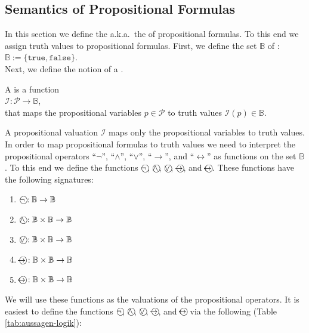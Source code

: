 \subsection{Semantics of Propositional Formulas}
In this section we define the  a.k.a.~the  of propositional
formulas.  To this end we assign truth values to propositional formulas.  First, we define the set 
$\mathbb{B}$  of :  \\[0.2cm] 
\hspace*{1.3cm} $\mathbb{B} := \{ \texttt{true}, \texttt{false} \}$. \\[0.2cm]
Next, we define the notion of a .

\begin{Definition}
  A 
   is a function \\[0.2cm]
  \hspace*{1.3cm} $\mathcal{I}:\mathcal{P} \rightarrow \mathbb{B}$, \\[0.2cm]
  that maps the propositional variables  $p\in \mathcal{P}$ to truth values $\mathcal{I}(p) \in \mathbb{B}$.
  \eox
\end{Definition}

A propositional valuation $\mathcal{I}$ maps only the propositional variables to truth values.
In order to map propositional formulas to truth values we need to interpret the propositional operators 
``$\neg$'', ``$\wedge$'', ``$\vee$'', ``$\rightarrow$'', and
``$\leftrightarrow$'' as functions on the set $\mathbb{B}$.  To this end we define the functions
$\circneg$, $\circwedge$, $\circvee$, $\circright$, and $\circleftright$.
These functions have the following signatures:
\begin{enumerate}
\item $\circneg: \mathbb{B} \rightarrow \mathbb{B}$ \index{$\circneg$}
\item $\circwedge: \mathbb{B} \times \mathbb{B} \rightarrow \mathbb{B}$ \index{$\circwedge$}
\item $\circvee: \mathbb{B} \times \mathbb{B} \rightarrow \mathbb{B}$ \index{$\circvee$}
\item $\circright: \mathbb{B} \times \mathbb{B} \rightarrow \mathbb{B}$ \index{$\circright$}
\item $\circleftright: \mathbb{B} \times \mathbb{B} \rightarrow \mathbb{B}$ \index{$\circleftright$}
\end{enumerate}
We will use these functions as the valuations of the propositional operators.
It is easiest to define the functions $\circneg$, $\circwedge$, $\circvee$, $\circright$, and $\circleftright$
via the following   (Table \ref{tab:aussagen-logik}):   


